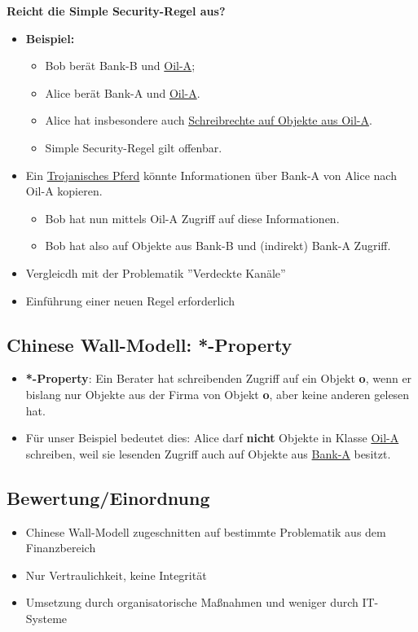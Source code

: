 \documentclass[openany]{book}
\begin{document}
\newpage

\textbf{Reicht die Simple Security-Regel aus?}

\begin{itemize}
\item \textbf{Beispiel:}
\begin{itemize}
\item Bob berät Bank-B und \underline{Oil-A};
\item Alice berät Bank-A und \underline{Oil-A}.
\item Alice hat insbesondere auch \underline{Schreibrechte auf Objekte aus Oil-A}.
\item Simple Security-Regel gilt offenbar.
\end{itemize}
\item Ein \underline{Trojanisches Pferd} könnte Informationen über Bank-A von Alice nach Oil-A kopieren.
\begin{itemize}
\item Bob hat nun mittels Oil-A Zugriff auf diese Informationen.
\item Bob hat also auf Objekte aus Bank-B und (indirekt) Bank-A Zugriff.
\end{itemize}
\item Vergleicdh mit der Problematik ''Verdeckte Kanäle''
\item Einführung einer neuen Regel erforderlich
\end{itemize}

\subsection{Chinese Wall-Modell: *-Property}

\begin{itemize}
\item \textbf{*-Property}: Ein Berater hat schreibenden Zugriff auf ein Objekt \textbf{o}, wenn er bislang nur Objekte aus der Firma von Objekt \textbf{o}, aber keine anderen gelesen hat.
\item Für unser Beispiel bedeutet dies: Alice darf \textbf{nicht} Objekte in Klasse \underline{Oil-A} schreiben, weil sie lesenden Zugriff auch auf Objekte aus \underline{Bank-A} besitzt.
\end{itemize}

\subsection{Bewertung/Einordnung}

\begin{itemize}
\item Chinese Wall-Modell zugeschnitten auf bestimmte Problematik aus dem Finanzbereich
\item Nur Vertraulichkeit, keine Integrität
\item Umsetzung durch organisatorische Maßnahmen und weniger durch IT-Systeme
\end{itemize}
\end{document}
